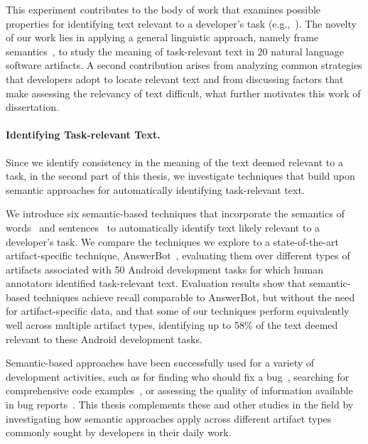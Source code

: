 This experiment contributes to the body of work that examines possible properties for identifying text relevant to a developer's task (e.g.,~\cite{Forward2002, Jiang2016b, Robillard2015, Bavota2016}).
The novelty of our work lies in 
applying a general
linguistic approach, namely frame semantics~\cite{fillmore1976frame, Baker1998}, 
to study the meaning of task-relevant text in 20 natural language software artifacts.
A second contribution arises from analyzing
common strategies that developers adopt to locate relevant text 
and from discussing
factors that make assessing the relevancy of text difficult,
what further motivates this work of dissertation.






\paragraph{\textbf{Identifying Task-relevant Text.}} 


Since we identify consistency in the meaning of the text deemed relevant to a task, 
in the second part of this thesis, we investigate
techniques that build upon semantic approaches 
for automatically identifying task-relevant text.


We introduce six semantic-based techniques that incorporate the semantics of words~\cite{Mikolov2013, Devlin2018Bert}
and sentences~\cite{fillmore1976frame, marques2021}
to automatically identify text likely relevant to a developer's task.
We compare the techniques we explore to a  state-of-the-art artifact-specific technique, AnswerBot~\cite{Xu2017},
 evaluating them over different types of artifacts
associated with 50 Android development tasks 
for which human annotators identified task-relevant text.
Evaluation results show that semantic-based techniques
achieve recall comparable to AnswerBot, but without the need for artifact-specific data,
and that some of our techniques perform equivalently well across
multiple artifact types, identifying up to 58\%
of the text 
deemed relevant to these Android development tasks.


Semantic-based approaches have been successfully used for a variety of development activities, such as
for finding who should fix a bug~\cite{yang2016}, searching for comprehensive code examples~\cite{silva2019},
or assessing the quality of information available in bug reports~\cite{chaparro2019}.
This thesis complements these and other studies in the field
by investigating how semantic approaches apply across different artifact types
commonly sought by developers in their daily work.




